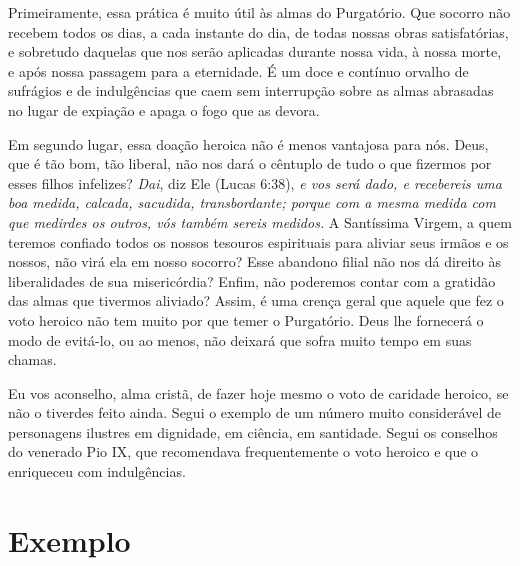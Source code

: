 Primeiramente, essa prática é muito útil às almas do Purgatório. Que socorro não recebem todos os dias, a cada instante do dia, de todas nossas obras satisfatórias, e sobretudo daquelas que nos serão aplicadas durante nossa vida, à nossa morte, e após nossa passagem para a eternidade. É um doce e contínuo orvalho de sufrágios e de indulgências que caem sem interrupção sobre as almas abrasadas no lugar de expiação e apaga o fogo que as devora. 

Em segundo lugar, essa doação heroica não é menos vantajosa para nós. Deus, que é tão bom, tão liberal, não nos dará o cêntuplo de tudo o que fizermos por esses filhos infelizes? \textit{Dai}, diz Ele (Lucas 6:38), \textit{e vos será dado, e recebereis uma boa medida, calcada, sacudida, transbordante; porque com a mesma medida com que medirdes os outros, vós também sereis medidos.} A Santíssima Virgem, a quem teremos confiado todos os nossos tesouros espirituais para aliviar seus irmãos e os nossos, não virá ela em nosso socorro? Esse abandono filial não nos dá direito às liberalidades de sua misericórdia? Enfim, não poderemos contar com a gratidão das almas que tivermos aliviado? Assim, é uma crença geral que aquele que fez o voto heroico não tem muito por que temer o Purgatório. Deus lhe fornecerá o modo de evitá-lo, ou ao menos, não deixará que sofra muito tempo em suas chamas. 

Eu vos aconselho, alma cristã, de fazer hoje mesmo o voto de caridade heroico, se não o tiverdes feito ainda. Segui o exemplo de um número muito considerável de personagens ilustres em dignidade, em ciência, em santidade. Segui os conselhos do venerado Pio IX, que recomendava frequentemente o voto heroico e que o enriqueceu com indulgências. 


\section*{Exemplo}

